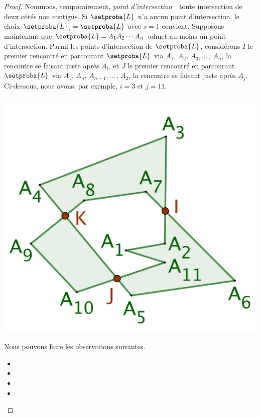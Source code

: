 \begin{proof}
	Nommons, temporairement, \og \emph{point d'intersection} \fg\ toute intersection de deux côtés non contigüs.
	Si $\setproba{L}$ n'a aucun point d'intersection,
	le choix $\setproba{L}_1 = \setproba{L}$ avec $s = 1$ convient.
	Supposons maintenant que $\setproba{L} = A_1 A_2 \cdots A_n$ admet au moins un point d'intersection.
	Parmi les points d'intersection de $\setproba{L}$, considérons 
	$I$ le premier rencontré en parcourant $\setproba{L}$ via $A_1$, $A_2$, $A_3$,\,...\,, $A_n$, la rencontre se faisant juste après $A_i$,
	et
	$J$ le premier rencontré en parcourant $\setproba{L}$ via $A_1$, $A_n$, $A_{n-1}$,\,...\,, $A_2$, la rencontre se faisant juste après $A_j$.
	Ci-dessous, nous avons, par exemple, $i = 3$ et $j = 11$.

	\begin{center}
		\includegraphics[scale=.35]{content/polygon/at-least-one/ngone-trick.png}
	\end{center}


    Nous pouvons faire les observations suivantes.
    \begin{itemize}
    	\item 

    	\item 

    	\item 

    	\item 
    \end{itemize}
	

\end{proof}
